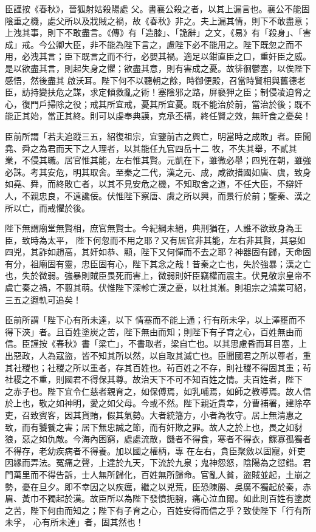 \begin{pinyinscope}
 臣謹按《春秋》，晉狐射姑殺陽處
 父。書襄公殺之者，以其上漏言也。襄公不能固陰重之機，處父所以及戕賊之禍，故《春秋》非之。夫上漏其情，則下不敢盡意；上洩其事，則下不敢盡言。《傳》有「造膝」、「詭辭」之文，《易》有「殺身」、「害成」戒。今公卿大臣，非不能為陛下言之，慮陛下必不能用之。陛下既忽之而不用，必洩其言；臣下既言之而不行，必嬰其禍。適足以鉗直臣之口，重奸臣之威。是以欲盡其言，則起失身之懼；欲盡其意，則有害成之憂。故徘徊鬱塞，以俟陛下感悟，然後盡其
 啟沃耳。陛下何不以聽朝之餘，時御便殿，召當時賢相與舊德老臣，訪持變扶危之謀，求定傾救亂之術！塞陰邪之路，屏褻狎之臣；制侵凌迫脅之心，復門戶掃除之役；戒其所宜戒，憂其所宜憂。既不能治於前，當治於後；既不能正其始，當正其終。則可以虔奉典謨，克承丕構，終任賢之效，無旰食之憂矣！



 臣前所謂「若夫追蹤三五，紹復祖宗，宜鑒前古之興亡，明當時之成敗」者。臣聞堯、舜之為君而天下之人理者，以其能任九官四岳十二
 牧，不失其舉，不貳其業，不侵其職。居官惟其能，左右惟其賢。元凱在下，雖微必舉；四兇在朝，雖強必誅。考其安危，明其取舍。至秦之二代，漢之元、成，咸欲措國如唐、虞，致身如堯、舜，而終敗亡者，以其不見安危之機，不知取舍之道，不任大臣，不辯奸人，不親忠良，不遠讒佞。伏惟陛下察唐、虞之所以興，而景行於前；鑒秦、漢之所以亡，而戒懼於後。



 陛下無謂廟堂無賢相，庶官無賢士。今紀綱未絕，典刑猶在，人誰不欲致身為王臣，致時為太平，
 陛下何忽而不用之耶？又有居官非其能，左右非其賢，其惡如四兇，其詐如趙高，其奸如恭、顯，陛下又何憚而不去之耶？神器固有歸，天命固有分，祖廟固有靈，忠臣固有心，陛下其念之哉！昔秦之亡也，失於強暴；漢之亡也，失於微弱。強暴則賊臣畏死而害上，微弱則奸臣竊權而震主。伏見敬宗皇帝不虞亡秦之禍，不翦其萌。伏惟陛下深軫亡漢之憂，以杜其漸。則祖宗之鴻業可紹，三五之遐軌可追矣！



 臣前所謂「陛下心有所未達，以下
 情塞而不能上通；行有所未孚，以上澤壅而不得下浹」者。且百姓塗炭之苦，陛下無由而知；則陛下有子育之心，百姓無由而信。臣謹按《春秋》書「梁亡」，不書取者，梁自亡也。以其思慮昏而耳目塞，上出惡政，人為寇盜，皆不知其所以然，以自取其滅亡也。臣聞國君之所以尊者，重其社稷也；社稷之所以重者，存其百姓也。茍百姓之不存，則社稷不得固其重；茍社稷之不重，則國君不得保其尊。故治天下不可不知百姓之情。夫百姓者，陛下
 之赤子也。陛下宜令仁慈者親育之，如保傅焉，如乳哺焉，如師之教導焉。故人信於上也，敬之如神明，愛之如父母。今或不然。陛下親近貴幸，分曹補署，建除卒吏，召致賓客，因其貨賄，假其氣勢。大者統籓方，小者為牧守。居上無清惠之致，而有饕餮之害；居下無忠誠之節，而有奸欺之罪。故人之於上也，畏之如豺狼，惡之如仇敵。今海內困窮，處處流散，饑者不得食，寒者不得衣，鰥寡孤獨者不得存，老幼疾病者不得養。加以國之權柄，專
 在左右，貪臣聚斂以固寵，奸吏因緣而弄法。冤痛之聲，上達於九天，下流於九泉；鬼神怨怒，陰陽為之愆錯。君門萬里而不得告訴，士人無所歸化，百姓無所歸命。官亂人貧，盜賊並起，土崩之勢，憂在旦夕。即不幸因之以疾癘，繼之以兇荒，臣恐陳勝、吳廣不獨起於秦，赤眉、黃巾不獨起於漢。故臣所以為陛下發憤扼腕，痛心泣血爾。如此則百姓有塗炭之苦，陛下何由而知之；陛下有子育之心，百姓安得而信之乎？致使陛下「行有所未孚，
 心有所未達」者，固其然也！




\end{pinyinscope}
